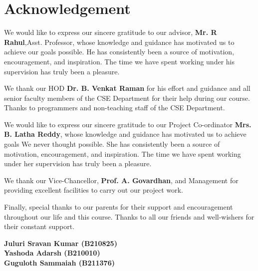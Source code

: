 \documentclass[12pt,a4paper]{report}
\begin{document}
\chapter*{Acknowledgement}

We would like to express our sincere gratitude to our advisor,
\textbf{Mr. R Rahul},Asst. Professor, whose knowledge and guidance has motivated us
to achieve our goals possible. He has consistently been a source of motivation,
encouragement, and inspiration. The time we have spent working under his
supervision has truly been a pleasure.

\vspace{0.5cm}

We thank our HOD \textbf{Dr. B. Venkat Raman} for his effort and guidance and all
senior faculty members of the CSE Department for their help during our course.
Thanks to programmers and non-teaching staff of the CSE Department.

\vspace{0.5cm}

We would like to express our sincere gratitude to our Project Co-ordinator
\textbf{Mrs. B. Latha Reddy}, whose knowledge and guidance has motivated us to
achieve goals We never thought possible. She has consistently been a source of
motivation, encouragement, and inspiration. The time we have spent working under
her supervision has truly been a pleasure.

\vspace{0.5cm}

We thank our Vice-Chancellor,\textbf{ Prof. A. Govardhan}, and Management for
providing excellent facilities to carry out our project work.

\vspace{0.5cm}

Finally, special thanks to our parents for their support and encouragement
throughout our life and this course. Thanks to all our friends and well-wishers
for their constant support.

\vspace{1cm}

\begin{flushright}
    \textbf{Juluri Sravan Kumar (B210825)}\\
    \textbf{Yashoda Adarsh (B210010)}\\
    \textbf{Guguloth Sammaiah (B211376)}
\end{flushright}
\clearpage
\end{document}

